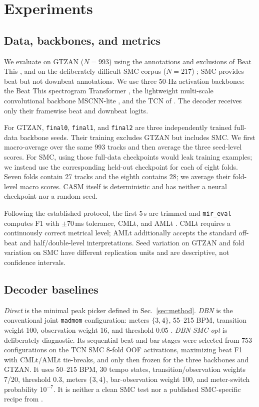 \documentclass{article}
\begin{document}
\section{Experiments}
\label{sec:exp}

\subsection{Data, backbones, and metrics}
We evaluate on GTZAN ($N=993$) using the annotations and exclusions of Beat This \cite{foscarin2024beat}, and on the deliberately difficult SMC corpus ($N=217$) \cite{smc}; SMC provides beat but not downbeat annotations. We use three 50-Hz activation backbones: the Beat This spectrogram Transformer \cite{foscarin2024beat}, the lightweight multi-scale convolutional backbone MSCNN-lite \cite{he2026dynest}, and the TCN of \cite{bock2020deconstruct}. The decoder receives only their framewise beat and downbeat logits.

For GTZAN, \texttt{final0}, \texttt{final1}, and \texttt{final2} are three independently trained full-data backbone seeds. Their training excludes GTZAN but includes SMC. We first macro-average over the same 993 tracks and then average the three seed-level scores. For SMC, using those full-data checkpoints would leak training examples; we instead use the corresponding held-out checkpoint for each of eight folds. Seven folds contain 27 tracks and the eighth contains 28; we average their fold-level macro scores. CASM itself is deterministic and has neither a neural checkpoint nor a random seed.

Following the established protocol, the first 5\,s are trimmed and \texttt{mir\_eval} computes F1 with $\pm70$\,ms tolerance, CMLt, and AMLt \cite{raffel2014mireval}. CMLt requires a continuously correct metrical level; AMLt additionally accepts the standard off-beat and half/double-level interpretations. Seed variation on GTZAN and fold variation on SMC have different replication units and are descriptive, not confidence intervals.


\subsection{Decoder baselines}
\emph{Direct} is the minimal peak picker defined in Sec.~\ref{sec:method}. \emph{DBN} is the conventional joint \texttt{madmom} configuration: meters $\{3,4\}$, 55--215 BPM, transition weight 100, observation weight 16, and threshold 0.05 \cite{krebs2015dbn}. \emph{DBN-SMC-opt} is deliberately diagnostic. Its sequential beat and bar stages were selected from 753 configurations on the TCN SMC 8-fold OOF activations, maximizing beat F1 with CMLt/AMLt tie-breaks, and only then frozen for the three backbones and GTZAN. It uses 50--215 BPM, 30 tempo states, transition/observation weights 7/20, threshold 0.3, meters $\{3,4\}$, bar-observation weight 100, and meter-switch probability $10^{-7}$. It is neither a clean SMC test nor a published SMC-specific recipe from \cite{bock2020deconstruct}.
\end{document}
